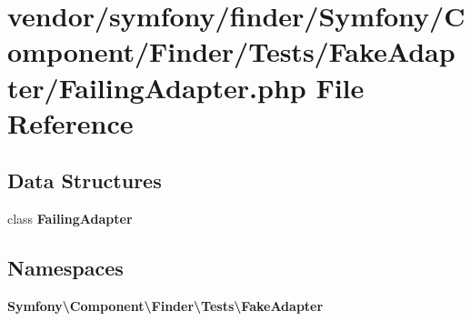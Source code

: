 \section{vendor/symfony/finder/\+Symfony/\+Component/\+Finder/\+Tests/\+Fake\+Adapter/\+Failing\+Adapter.php File Reference}
\label{_failing_adapter_8php}
\subsection*{Data Structures}
\begin{DoxyCompactItemize}
\item 
class {\bf Failing\+Adapter}
\end{DoxyCompactItemize}
\subsection*{Namespaces}
\begin{DoxyCompactItemize}
\item 
 {\bf Symfony\textbackslash{}\+Component\textbackslash{}\+Finder\textbackslash{}\+Tests\textbackslash{}\+Fake\+Adapter}
\end{DoxyCompactItemize}
